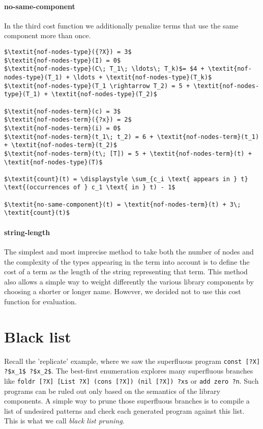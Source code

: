   \paragraph{no-same-component}
In the third cost function we additionally penalize terms that use the same component more than once.
%
\begin{lstlisting}[style=algorithm]
$\textit{nof-nodes-type}({?X}) = 3$
$\textit{nof-nodes-type}(I) = 0$
$\textit{nof-nodes-type}(C\; T_1\; \ldots\; T_k)$= $4 + \textit{nof-nodes-type}(T_1) + \ldots + \textit{nof-nodes-type}(T_k)$
$\textit{nof-nodes-type}(T_1 \rightarrow T_2) = 5 + \textit{nof-nodes-type}(T_1) + \textit{nof-nodes-type}(T_2)$

$\textit{nof-nodes-term}(c) = 3$
$\textit{nof-nodes-term}({?x}) = 2$
$\textit{nof-nodes-term}(i) = 0$
$\textit{nof-nodes-term}(t_1\; t_2) = 6 + \textit{nof-nodes-term}(t_1) + \textit{nof-nodes-term}(t_2)$
$\textit{nof-nodes-term}(t\; [T]) = 5 + \textit{nof-nodes-term}(t) + \textit{nof-nodes-type}(T)$

$\textit{count}(t) = \displaystyle \sum_{c_i \text{ appears in } t} \text{(occurrences of } c_1 \text{ in } t) - 1$

$\textit{no-same-component}(t) = \textit{nof-nodes-term}(t) + 3\; \textit{count}(t)$
\end{lstlisting}

  \paragraph{string-length}
The simplest and most imprecise method to take both the number of nodes and the complexity of the types appearing in the term into account is to define the cost of a term as the length of the string representing that term. This method also allows a simple way to weight differently the various library components by choosing a shorter or longer name. However, we decided not to use this cost function for evaluation.

\section{Black list}\label{Black list}
Recall the 'replicate' example, where we saw the superfluous program \lstinline!const [?X] ?$x_1$ ?$x_2$!. The best-first enumeration explores many superfluous branches like \lstinline!foldr [?X] [List ?X] (cons [?X]) (nil [?X]) ?xs! or \lstinline!add zero ?n!. Such programs can be ruled out only based on the semantics of the library components. A simple way to prune those superfluous branches is to compile a list of undesired patterns and check each generated program against this list. This is what we call \emph{black list pruning}.

